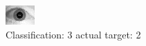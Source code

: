 \begin{figure}[h!]
\begin{center}
\includegraphics[width=0.60\columnwidth]{figures/ID1629_class_3_target_2.png}
\end{center}
\caption{ Classification: 3 actual target: 2}
\label{fig:ID1629_class_3_target_2}
\end{figure}
